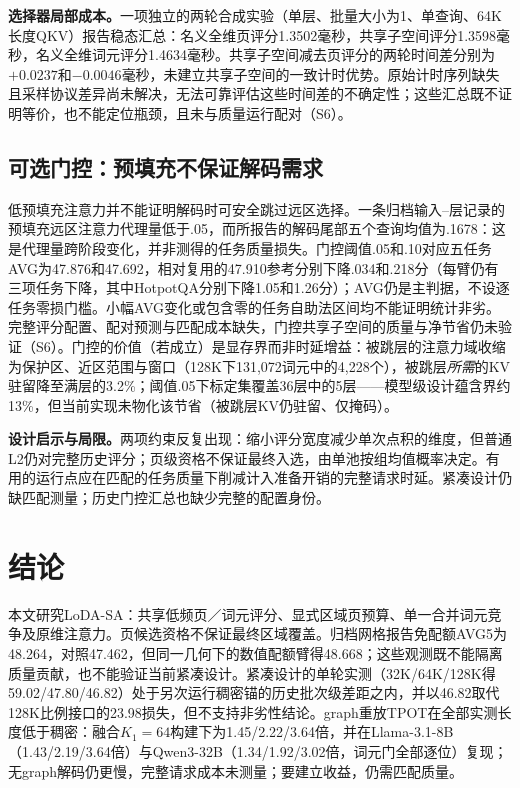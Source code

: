\documentclass[conference,9pt,letterpaper]{IEEEtran}
\begin{document}
\textbf{选择器局部成本。}一项独立的两轮合成实验（单层、批量大小为1、单查询、64K长度QKV）报告稳态汇总：名义全维页评分1.3502毫秒，共享子空间评分1.3598毫秒，名义全维词元评分1.4634毫秒。共享子空间减去页评分的两轮时间差分别为$+0.0237$和$-0.0046$毫秒，未建立共享子空间的一致计时优势。原始计时序列缺失且采样协议差异尚未解决，无法可靠评估这些时间差的不确定性；这些汇总既不证明等价，也不能定位瓶颈，且未与质量运行配对（S6）。

\subsection{可选门控：预填充不保证解码需求}
低预填充注意力并不能证明解码时可安全跳过远区选择。一条归档输入--层记录的预填充远区注意力代理量低于.05，而所报告的解码尾部五个查询均值为.1678：这是代理量跨阶段变化，并非测得的任务质量损失。门控阈值.05和.10对应五任务AVG为47.876和47.692，相对复用的47.910参考分别下降.034和.218分（每臂仍有三项任务下降，其中HotpotQA分别下降1.05和1.26分）；AVG仍是主判据，不设逐任务零损门槛。小幅AVG变化或包含零的任务自助法区间均不能证明统计非劣。完整评分配置、配对预测与匹配成本缺失，门控共享子空间的质量与净节省仍未验证（S6）。门控的价值（若成立）是显存界而非时延增益：被跳层的注意力域收缩为保护区、近区范围与窗口（128K下131,072词元中的4,228个），被跳层\emph{所需}的KV驻留降至满层的3.2\%；阈值.05下标定集覆盖36层中的5层——模型级设计蕴含界约13\%，但当前实现未物化该节省（被跳层KV仍驻留、仅掩码）。

\textbf{设计启示与局限。}两项约束反复出现：缩小评分宽度减少单次点积的维度，但普通L2仍对完整历史评分；页级资格不保证最终入选，由单池按组均值概率决定。有用的运行点应在匹配的任务质量下削减计入准备开销的完整请求时延。紧凑设计仍缺匹配测量；历史门控汇总也缺少完整的配置身份。

\section{结论}
本文研究LoDA-SA：共享低频页／词元评分、显式区域页预算、单一合并词元竞争及原维注意力。页候选资格不保证最终区域覆盖。归档网格报告免配额AVG5为48.264，对照47.462，但同一几何下的数值配额臂得48.668；这些观测既不能隔离质量贡献，也不能验证当前紧凑设计。紧凑设计的单轮实测（32K/64K/128K得59.02/47.80/46.82）处于另次运行稠密锚的历史批次级差距之内，并以46.82取代128K比例接口的23.98损失，但不支持非劣性结论。graph重放TPOT在全部实测长度低于稠密：融合$K_1{=}64$构建下为1.45/2.22/3.64倍，并在Llama-3.1-8B（1.43/2.19/3.64倍）与Qwen3-32B（1.34/1.92/3.02倍，词元门全部逐位）复现；无graph解码仍更慢，完整请求成本未测量；要建立收益，仍需匹配质量。

\smallskip{}\medskip
\clearpage

\end{document}
